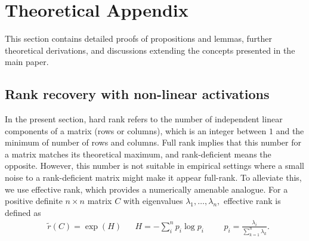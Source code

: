 \documentclass{article}
\newcommand{\ff}[1]{\todo[color=blue!30,size=\tiny]{FF: #1}}
\numberwithin{figure}{section}
\begin{document}





\appendix

\section{Theoretical Appendix}
\label{app:theory_appendix}
This section contains detailed proofs of propositions and lemmas, further theoretical derivations, and discussions extending the concepts presented in the main paper. 

\subsection{Rank recovery with non-linear activations}

In the present section, hard rank refers to the number of independent linear components of a matrix (rows or columns), which is an integer between $1$ and the minimum of number of rows and columns. Full rank implies that this number for a matrix matches its theoretical maximum, and rank-deficient means the opposite. However, this number is not suitable in empirical settings where a small noise to a rank-deficient matrix might make it appear full-rank. To alleviate this, we use effective rank, which provides a numerically amenable analogue. For a positive definite $n\times n$ matrix $C$ with eigenvalues $\lambda_1,\dots, \lambda_n,$ effective rank is defined as 
\begin{align*}
&\tilde{r}(C)= \exp(H) &&H =-\sum_i^n p_i\log p_i &&&  p_i = \frac{\lambda_i}{\sum_{k=1}^n \lambda_k}.
\end{align*}
\end{document}
